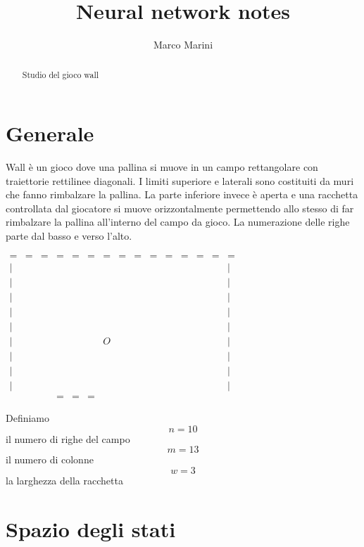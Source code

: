 \documentclass[a4paper,11pt]{article}
\title{Neural network notes}
\author{Marco Marini}
\begin{document}
\maketitle
\tableofcontents

\begin{abstract}
Studio del gioco wall
\end{abstract}

\section{Generale}

Wall è un gioco dove una pallina si muove in un campo rettangolare con traiettorie rettilinee diagonali.
I limiti superiore e laterali sono costituiti da muri che
fanno rimbalzare la pallina.
La parte inferiore invece è aperta e una racchetta controllata dal giocatore si muove orizzontalmente
permettendo allo stesso di far rimbalzare la pallina all'interno del campo da gioco.
La numerazione delle righe parte dal basso e verso l'alto.

$
\begin{array}{ccccccccccccccc}
=	& = & = & = & = & = & = & = & = & = & = & = & = & = & = \\
|	&  &  &  &  &  &  &  &  &  &  &  &  &  & | \\ 
|	&  &  &  &  &  &  &  &  &  &  &  &  &  & | \\ 
|	&  &  &  &  &  &  &  &  &  &  &  &  &  & | \\ 
|	&  &  &  &  &  &  &  &  &  &  &  &  &  & | \\ 
|	&  &  &  &  &  &  &  &  &  &  &  &  &  & | \\ 
|	&  &  &  &  &  & O &  &  &  &  &  &  &  & | \\ 
|	&  &  &  &  &  &  &  &  &  &  &  &  &  & | \\ 
|	&  &  &  &  &  &  &  &  &  &  &  &  &  & | \\ 
|	&  &  &  &  &  &  &  &  &  &  &  &  &  & | \\ 
	&  &  & = & = & = &  &  &  &  &  &  &  &  & 
\end{array} 
$

Definiamo 
\[ n = 10 \] il numero di righe del campo
\[ m = 13 \] il numero di colonne
\[ w = 3 \] la larghezza della racchetta


\section{Spazio degli stati}
\end{document}
